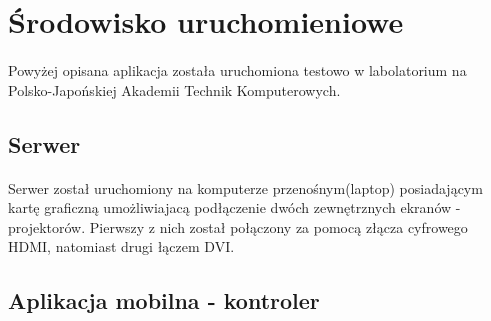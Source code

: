 \section{Środowisko uruchomieniowe}
\paragraph{}
Powyżej opisana aplikacja została uruchomiona testowo w labolatorium na Polsko-Japońskiej Akademii Technik Komputerowych.

\subsection{Serwer}
\paragraph{}
Serwer został uruchomiony na komputerze przenośnym(laptop) posiadającym kartę graficzną umożliwiajacą podłączenie dwóch zewnętrznych ekranów - projektorów. Pierwszy z nich został połączony za pomocą złącza cyfrowego HDMI, natomiast drugi łączem DVI.
\subsection{Aplikacja mobilna - kontroler}